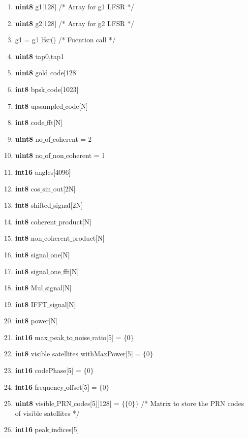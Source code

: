 \documentclass[journal,10pt,onecolumn]{article}
\begin{document}
\begin{itemize}
\begin{enumerate}
    \item[] \textbf{uint8} g1[128]   \hspace{5mm} /*  Array for g1 LFSR */
    \item[] \textbf{uint8} g2[128]   \hspace{5mm} /* Array for g2 LFSR */
    \item[] g1 =  g1$\_$lfsr()       \hspace{5mm} /* Fucntion call */
    \item[] \textbf{uint8} tap0,tap1
    \item[] \textbf{uint8} gold$\_$code[128] 
    \item[] \textbf{int8} bpsk$\_$code[1023]
    \item[] \textbf{int8} upsampled$\_$code[N]
    \item[] \textbf{int8} code$\_$fft[N]
    \item[] \textbf{uint8} no$\_$of$\_$coherent = 2
    \item[] \textbf{uint8} no$\_$of$\_$non$\_$coherent = 1
    \item[] \textbf{int16} angles[4096]
    \item[] \textbf{int8} cos$\_$sin$\_$out[2N]
    \item[] \textbf{int8} shifted$\_$signal[2N]
    \item[] \textbf{int8}  coherent$\_$product[N]
    \item[] \textbf{int8} non$\_$coherent$\_$product[N]
    \item[] \textbf{int8} signal$\_$one[N]
    \item[] \textbf{int8} signal$\_$one$\_$fft[N]
    \item[] \textbf{int8} Mul$\_$signal[N]
    \item[] \textbf{int8} IFFT$\_$signal[N]
    \item[] \textbf{int8} power[N]
    \item[] \textbf{int16} max$\_$peak$\_$to$\_$noise$\_$ratio[5] = $\{0\}$ 
    \item[] \textbf{int8} visible$\_$satellites$\_$withMaxPower[5] = $\{0\}$
    \item[] \textbf{int16} codePhase[5] = $\{0\}$
    \item[] \textbf{int16} frequency$\_$offset[5] = $\{0\}$
    \item[] \textbf{uint8} visible$\_$PRN$\_$codes[5][128] = $\{\{0\}\}$  \hspace{5mm} /* Matrix to store the PRN codes of visible satellites */ 
    \item[] \textbf{int16} peak$\_$indices[5]

\end{enumerate}
\end{itemize}
\end{document}
